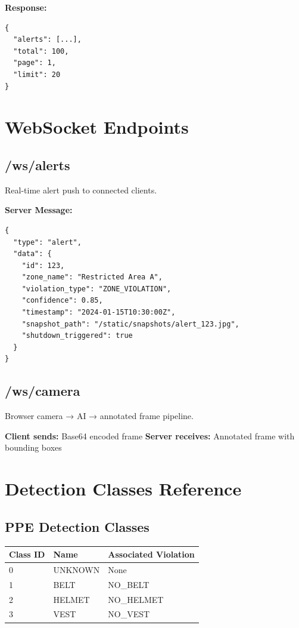 \documentclass[12pt,a4paper,oneside]{book}
\begin{document}
\textbf{Response:}
\begin{lstlisting}[style=jsonstyle]
{
  "alerts": [...],
  "total": 100,
  "page": 1,
  "limit": 20
}
\end{lstlisting}

\section{WebSocket Endpoints}

\subsection{/ws/alerts}

Real-time alert push to connected clients.

\textbf{Server Message:}
\begin{lstlisting}[style=jsonstyle]
{
  "type": "alert",
  "data": {
    "id": 123,
    "zone_name": "Restricted Area A",
    "violation_type": "ZONE_VIOLATION",
    "confidence": 0.85,
    "timestamp": "2024-01-15T10:30:00Z",
    "snapshot_path": "/static/snapshots/alert_123.jpg",
    "shutdown_triggered": true
  }
}
\end{lstlisting}

\subsection{/ws/camera}

Browser camera → AI → annotated frame pipeline.

\textbf{Client sends:} Base64 encoded frame
\textbf{Server receives:} Annotated frame with bounding boxes

\section{Detection Classes Reference}

\subsection{PPE Detection Classes}

\begin{tabular}{|l|l|l|}
    \hline
    \textbf{Class ID} & \textbf{Name} & \textbf{Associated Violation} \\
    \hline
    0 & UNKNOWN & None \\
    \hline
    1 & BELT & NO\_BELT \\
    \hline
    2 & HELMET & NO\_HELMET \\
    \hline
    3 & VEST & NO\_VEST \\
    \hline
\end{tabular}
\end{document}
